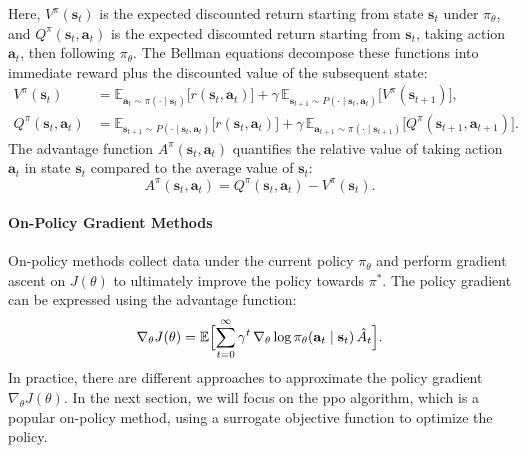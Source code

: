 Here, \(V^\pi(\mathbf{s}_t)\) is the expected discounted return starting from state \(\mathbf{s}_t\) under \(\pi_\theta\), and \(Q^\pi(\mathbf{s}_t,\mathbf{a}_t)\) is the expected discounted return starting from \(\mathbf{s}_t\), taking action \(\mathbf{a}_t\), then following \(\pi_\theta\).
The Bellman equations decompose these functions into immediate reward plus the discounted value of the subsequent state:
\begin{align}
V^\pi(\mathbf{s}_t)
&= \mathbb{E}_{\mathbf{a}_t\sim\pi(\cdot\mid \mathbf{s}_t)}\bigl[r(\mathbf{s}_t,\mathbf{a}_t)\bigr]
  + \gamma\,\mathbb{E}_{\mathbf{s}_{t+1}\sim P(\cdot\mid \mathbf{s}_t,\mathbf{a}_t)}\bigl[V^\pi(\mathbf{s}_{t+1})\bigr],\\
Q^\pi(\mathbf{s}_t,\mathbf{a}_t)
&= \mathbb{E}_{\mathbf{s}_{t+1}\sim P(\cdot\mid \mathbf{s}_t,\mathbf{a}_t)}\bigl[r(\mathbf{s}_t,\mathbf{a}_t)\bigr]
  + \gamma\,\mathbb{E}_{\mathbf{a}_{t+1}\sim\pi(\cdot\mid \mathbf{s}_{t+1})}\bigl[Q^\pi(\mathbf{s}_{t+1},\mathbf{a}_{t+1})\bigr].
\end{align}
The advantage function \(A^\pi(\mathbf{s}_t,\mathbf{a}_t)\) quantifies the relative value of taking action \(\mathbf{a}_t\) in state \(\mathbf{s}_t\) compared to the average value of \(\mathbf{s}_t\):
\begin{equation}
A^\pi(\mathbf{s}_t,\mathbf{a}_t) = Q^\pi(\mathbf{s}_t,\mathbf{a}_t) - V^\pi(\mathbf{s}_t).
\end{equation}

\paragraph{On-Policy Gradient Methods}
On-policy methods collect data under the current policy \(\pi_\theta\) and perform gradient ascent on \(J(\theta)\) to ultimately improve the policy towards \(\pi^*\). The policy gradient can be expressed using the advantage function:
\begin{equation}
\nabla_\theta J(\theta)
= \mathbb{E}\Bigl[\sum_{t=0}^\infty \gamma^t \,\nabla_\theta \log \pi_\theta(\mathbf{a}_t\mid \mathbf{s}_t)\,\hat A_t\Bigr].
\end{equation}
In practice, there are different approaches to approximate the policy gradient \(\nabla_{\theta}J(\theta)\). In the next section, we will focus on the \gls{ppo} algorithm, which is a popular on-policy method, using a surrogate objective function to optimize the policy.
